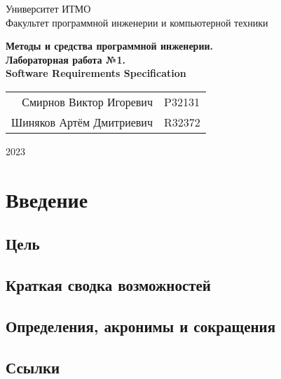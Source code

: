 \documentclass{article}
\begin{document}
\begin{titlepage}
  \begin{center}
    \begin{spacing}{1.4}
      \large{Университет ИТМО} \\
      \large{Факультет программной инженерии и компьютерной техники} \\
    \end{spacing}    
    \vfill
    \textbf{
      \huge{Методы и средства программной инженерии.} \\
      \huge{Лабораторная работа №1.} \\
      \huge{Software Requirements Specification} \\
    }
  \end{center}
  \vfill
  \begin{center}
    \begin{tabular}{r l}
      Смирнов Виктор Игоревич  & P32131 \\
      Шиняков Артём Дмитриевич & R32372 \\
    \end{tabular}
  \end{center}
  \vfill
  \begin{center}
    \begin{large}
      2023
    \end{large}
  \end{center}
\end{titlepage}


\section{Введение}

\subsection{Цель}


\subsection{Краткая сводка возможностей}


\subsection{Определения, акронимы и сокращения}


\subsection{Ссылки}

\end{document}
